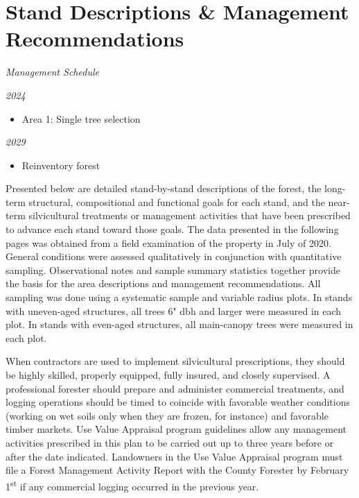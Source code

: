 \documentclass[]{tufte-handout}
\begin{document}
\section{Stand Descriptions \& Management
Recommendations}\label{stand-descriptions-management-recommendations}

\begin{marginfigure} \noindent \textit{\LARGE Management Schedule} 

 \vspace{10 pt} 

 \noindent \textit{\large 2024} 

 \begin{itemize} \item Area 1: Single tree selection 

 \end{itemize} \vspace{10 pt} 

 \noindent \textit{\large 2029} 

 \begin{itemize} \item Reinventory forest 

 \end{itemize} \end{marginfigure}

Presented below are detailed stand-by-stand descriptions of the forest,
the long-term structural, compositional and functional goals for each
stand, and the near-term silvicultural treatments or management
activities that have been prescribed to advance each stand toward those
goals. The data presented in the following pages was obtained from a
field examination of the property in July of 2020. General conditions
were assessed qualitatively in conjunction with quantitative sampling.
Observational notes and sample summary statistics together provide the
basis for the area descriptions and management recommendations. All
sampling was done using a systematic sample and variable radius plots.
In stands with uneven-aged structures, all trees 6" dbh and larger were
measured in each plot. In stands with even-aged structures, all
main-canopy trees were measured in each plot.

When contractors are used to implement silvicultural prescriptions, they
should be highly skilled, properly equipped, fully insured, and closely
supervised. A professional forester should prepare and administer
commercial treatments, and logging operations should be timed to
coincide with favorable weather conditions (working on wet soils only
when they are frozen, for instance) and favorable timber markets. Use
Value Appraisal program guidelines allow any management activities
prescribed in this plan to be carried out up to three years before or
after the date indicated. Landowners in the Use Value Appraisal program
must file a Forest Management Activity Report with the County Forester
by February 1\textsuperscript{st} if any commercial logging occurred in
the previous year.
\end{document}
